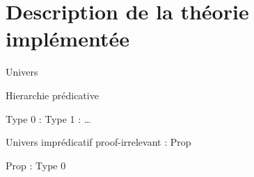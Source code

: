 \documentclass[12pt]{beamer}
\begin{document}
    \section{Description de la théorie implémentée}

        \begin{frame}[fragile]{Univers}
            
            \begin{block}{Hierarchie prédicative}
        
                Type 0 : Type 1 : \dots \pause

                \begin{center}
                    \begin{prooftree}
                    \end{prooftree}
                \end{center}
                
            \end{block}

            \begin{block}{Univers imprédicatif proof-irrelevant : Prop}
                
                Prop : Type 0 \pause

                \begin{center}
                    \begin{prooftree}
                    \end{prooftree}
                \end{center}

            \end{block}

        \end{frame}
\end{document}
